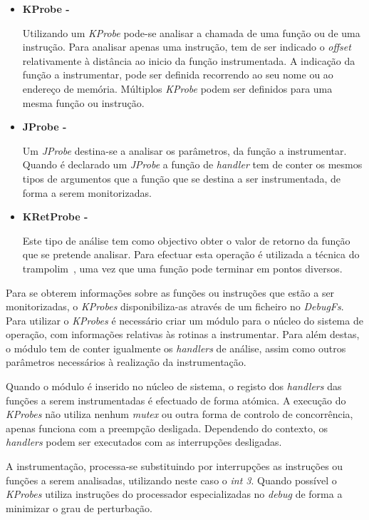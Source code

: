\begin{itemize}
 \item \textbf{KProbe - }

Utilizando um \textit{KProbe} pode-se analisar a chamada de uma função ou de uma instrução.
Para analisar apenas uma instrução, tem de ser indicado o \textit{offset} relativamente à distância ao inicio da função instrumentada.
A indicação da função a instrumentar, pode ser definida recorrendo ao seu nome ou ao endereço de memória.
Múltiplos \textit{KProbe} podem ser definidos para uma mesma função ou instrução.

\item \textbf{JProbe - }

Um \textit{JProbe} destina-se a analisar os parâmetros, da função a instrumentar.
Quando é declarado um \textit{JProbe} a função de \textit{handler} tem de conter os mesmos tipos de argumentos que a função que se destina a ser instrumentada, de forma a serem monitorizadas.
 
 \item \textbf{KRetProbe - }

Este tipo de análise tem como objectivo obter o valor de retorno da função que se pretende analisar.
Para efectuar esta operação é utilizada a técnica do trampolim~\cite{Hollingsworth94dynamicprogram}, uma vez que uma função pode terminar em pontos diversos.

\end{itemize}

Para se obterem informações sobre as funções ou instruções que estão a ser monitorizadas, o \textit{KProbes} disponibiliza-as através de um ficheiro no \textit{DebugFs}.
Para utilizar o \textit{KProbes} é necessário criar um módulo para o núcleo do sistema de operação, com informações relativas às rotinas a instrumentar.
Para além destas, o módulo tem de conter igualmente os \textit{handlers} de análise, assim como outros parâmetros necessários à realização da instrumentação.

Quando o módulo é inserido no núcleo de sistema, o registo dos \textit{handlers} das funções a serem instrumentadas é efectuado de forma atómica.
A execução do \textit{KProbes} não utiliza nenhum \textit{mutex} ou outra forma de controlo de concorrência, apenas funciona com a preempção desligada.
Dependendo do contexto, os \textit{handlers} podem ser executados com as interrupções desligadas.

A instrumentação, processa-se substituindo por interrupções as instruções ou funções a serem analisadas, utilizando neste caso o \textit{int 3}.
Quando possível o \textit{KProbes} utiliza instruções do processador especializadas no \textit{debug} de forma a minimizar o grau de perturbação.

